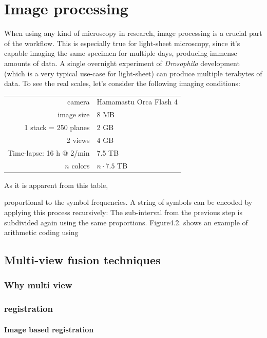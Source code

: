 

\chapter{Image processing}
\graphicspath{{./figures/3_processing/}}

When using any kind of microscopy in research, image processing is a crucial part of the workflow. This is especially true for light-sheet microscopy, since it's capable imaging the same specimen for multiple days, producing immense amounts of data. A single overnight experiment of \textit{Drosophila} development (which is a very typical use-case for light-sheet) can produce multiple terabytes of data. To see the real scales, let's consider the following imaging conditions:
\begin{center}
\begin{tabular}{rl}
    camera & Hamamastu Orca Flash 4 \\
    image size & 8 MB \\
    1 stack = 250 planes & 2 GB \\
    2 views & 4 GB \\
    Time-lapse: 16 h @ 2/min & 7.5 TB \\
    $n$ colors & $n\cdot 7.5$ TB
\end{tabular}
\end{center}

As it is apparent from this table, 


proportional to the symbol frequencies. A string of symbols can be encoded by applying this process recursively: The sub-interval from the previous step is subdivided again using the same proportions. Figure4.2. shows an example of arithmetic coding using

\section{Multi-view fusion techniques}
    \subsection{Why multi view}
    
    \subsection{registration}
        \subsubsection{Image based registration}
